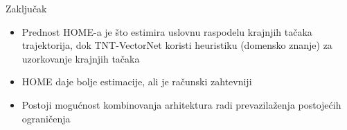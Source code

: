 \documentclass[bookmarks=true,bookmarksopen=true,pdfborder={0 0 0},pdfhighlight={/N},linkbordercolor={.5 .5 .5},implicit=false,unicode,xcolor={table}]{beamer}
\begin{document}
\begin{frame}{Zaključak}

  \begin{itemize}
    \item Prednost HOME-a je što estimira uslovnu raspodelu krajnjih tačaka trajektorija, dok TNT-VectorNet koristi heuristiku (domensko znanje)
          za uzorkovanje krajnjih tačaka
    \item HOME daje bolje estimacije, ali je računski zahtevniji
    \item Postoji mogućnost kombinovanja arhitektura radi prevazilaženja postojećih ograničenja
  \end{itemize}

\end{frame}
\end{document}

